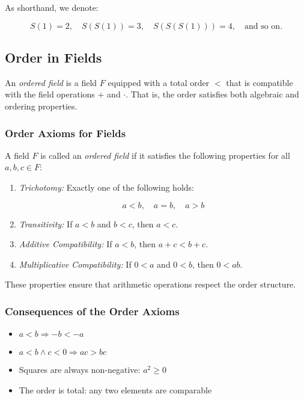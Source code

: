As shorthand, we denote:

\[
	S(1) = 2, \quad S(S(1)) = 3, \quad S(S(S(1))) = 4, \quad \text{and so on.}
\]

\subsection{Order in Fields}

An \emph{ordered field} is a field \( F \) equipped with a total order \( < \) that is compatible with 
the field operations \( + \) and \( \cdot \). That is, the order satisfies both algebraic and ordering 
properties.

\subsubsection{Order Axioms for Fields}

A field \( F \) is called an \emph{ordered field} if it satisfies the following properties for all 
\( a, b, c \in F \):

\begin{enumerate}[label=\Roman*.]
    
	\item \emph{Trichotomy:} Exactly one of the following holds:
 
		  \[
 	   			a < b, \quad a = b, \quad a > b
    	   \]

    \item \emph{Transitivity:} If \( a < b \) and \( b < c \), then \( a < c \).

    \item \emph{Additive Compatibility:} If \( a < b \), then \( a + c < b + c \).

    \item \emph{Multiplicative Compatibility:} If \( 0 < a \) and \( 0 < b \), then \( 0 < ab \).

\end{enumerate}

These properties ensure that arithmetic operations respect the order structure.

\subsubsection{Consequences of the Order Axioms}

\begin{itemize}

	\item \( a < b \Rightarrow -b < -a \)

	\item \( a < b \land c < 0 \Rightarrow ac > bc \)

	\item Squares are always non-negative: \( a^2 \ge 0 \)

	\item The order is total: any two elements are comparable

\end{itemize}

